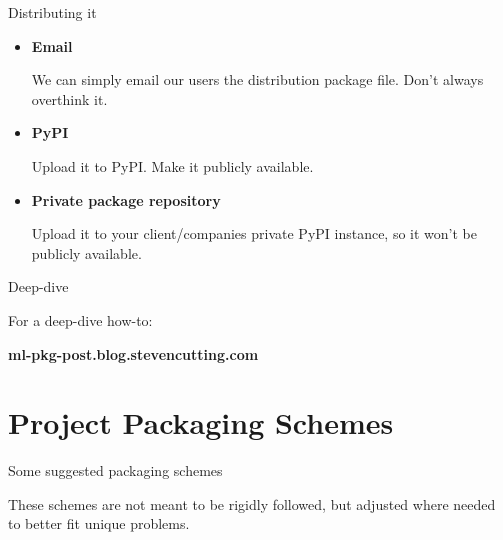 \documentclass[10pt]{beamer}
\begin{document}


\begin{frame}[fragile]{Distributing it}

  \begin{itemize}
    \item \textbf{Email}

      We can simply email our users the distribution package file. Don't always overthink it.

    \item \textbf{PyPI}

      Upload it to PyPI. Make it publicly available.

    \item \textbf{Private package repository}

      Upload it to your client/companies private PyPI instance, so it won't be publicly available.
  \end{itemize}

\end{frame}

\begin{frame}[fragile]{Deep-dive}

  For a deep-dive how-to:

  \textbf{ml-pkg-post.blog.stevencutting.com}
  
\end{frame}





\section{Project Packaging Schemes}


\begin{frame}[fragile]{Some suggested packaging schemes}

  These schemes are not meant to be rigidly followed, but adjusted where needed to better fit unique problems.

\end{frame}


\end{document}
